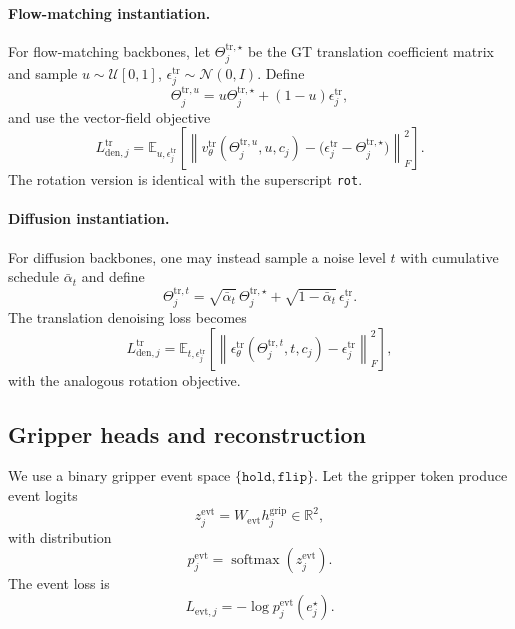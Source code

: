 \documentclass[10pt,twocolumn,letterpaper]{article}
\begin{document}
\paragraph{Flow-matching instantiation.}
For flow-matching backbones, let $\Theta_j^{\mathrm{tr},\star}$ be the GT translation coefficient matrix and sample $u\sim\mathcal{U}[0,1]$, $\epsilon_j^{\mathrm{tr}}\sim\mathcal{N}(0,I)$. Define
\begin{equation}
\Theta_j^{\mathrm{tr},u} = u\Theta_j^{\mathrm{tr},\star} + (1-u)\epsilon_j^{\mathrm{tr}},
\end{equation}
and use the vector-field objective
\begin{equation}
L_{\mathrm{den},j}^{\mathrm{tr}} =
\mathbb{E}_{u,\epsilon_j^{\mathrm{tr}}}
\left[\left\|v_{\theta}^{\mathrm{tr}}(\Theta_j^{\mathrm{tr},u},u,c_j)-\bigl(\epsilon_j^{\mathrm{tr}}-\Theta_j^{\mathrm{tr},\star}\bigr)\right\|_F^2\right].
\end{equation}
The rotation version is identical with the superscript \texttt{rot}.

\paragraph{Diffusion instantiation.}
For diffusion backbones, one may instead sample a noise level $t$ with cumulative schedule $\bar\alpha_t$ and define
\begin{equation}
\Theta_j^{\mathrm{tr},t} = \sqrt{\bar\alpha_t}\,\Theta_j^{\mathrm{tr},\star} + \sqrt{1-\bar\alpha_t}\,\epsilon_j^{\mathrm{tr}}.
\end{equation}
The translation denoising loss becomes
\begin{equation}
L_{\mathrm{den},j}^{\mathrm{tr}} =
\mathbb{E}_{t,\epsilon_j^{\mathrm{tr}}}
\left[\left\|\epsilon_{\theta}^{\mathrm{tr}}(\Theta_j^{\mathrm{tr},t},t,c_j)-\epsilon_j^{\mathrm{tr}}\right\|_F^2\right],
\end{equation}
with the analogous rotation objective.

\subsection{Gripper heads and reconstruction}
We use a binary gripper event space $\{\texttt{hold},\texttt{flip}\}$. Let the gripper token produce event logits
\begin{equation}
z_j^{\mathrm{evt}} = W_{\mathrm{evt}}h_j^{\mathrm{grip}} \in \mathbb{R}^{2},
\end{equation}
with distribution
\begin{equation}
p_j^{\mathrm{evt}} = \operatorname{softmax}(z_j^{\mathrm{evt}}).
\end{equation}
The event loss is
\begin{equation}
L_{\mathrm{evt},j} = -\log p_j^{\mathrm{evt}}(e_j^{\star}).
\end{equation}
\end{document}

